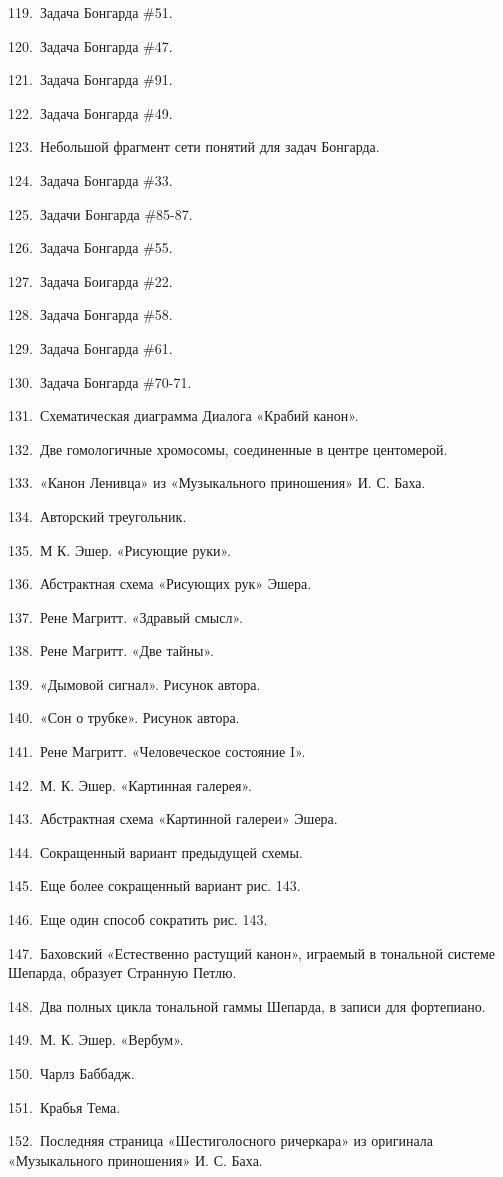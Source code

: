 \documentclass[../main.tex]{subfiles}
\begin{document}
119.~Задача Бонгарда \#51.

120.~Задача Бонгарда \#47.

121.~Задача Бонгарда \#91.

122.~Задача Бонгарда \#49.

123.~Небольшой фрагмент сети понятий для задач Бонгарда.

124.~Задача Бонгарда \#33.

125.~Задачи Бонгарда \#85-87.

126.~Задача Бонгарда \#55.

127.~Задача Боигарда \#22.

128.~Задача Бонгарда \#58.

129.~Задача Бонгарда \#61.

130.~Задача Бонгарда \#70-71.

131.~Схематическая диаграмма Диалога «Крабий канон».

132.~Две гомологичные хромосомы, соединенные в центре центомерой.

133.~«Канон Ленивца» из «Музыкального приношения» И. С. Баха.

134.~Авторский треугольник.

135.~М К. Эшер. «Рисующие руки».

136.~Абстрактная схема «Рисующих рук» Эшера.

137.~Рене Магритт. «Здравый смысл».

138.~Рене Магритт. «Две тайны».

139.~«Дымовой сигнал». Рисунок автора.

140.~«Сон о трубке». Рисунок автора.

141.~Рене Магритт. «Человеческое состояние I».

142.~М. К. Эшер. «Картинная галерея».

143.~Абстрактная схема «Картинной галереи» Эшера.

144.~Сокращенный вариант предыдущей схемы.

145.~Еще более сокращенный вариант рис. 143.

146.~Еще один способ сократить рис. 143.

147.~Баховский «Естественно растущий канон», играемый в тональной системе Шепарда, образует Странную Петлю.

148.~Два полных цикла тональной гаммы Шепарда, в записи для фортепиано.

149.~М. К. Эшер. «Вербум».

150.~Чарлз Баббадж.

151.~Крабья Тема.

152.~Последняя страница «Шестиголосного ричеркара» из оригинала «Музыкального приношения» И. С. Баха.
\end{document}
